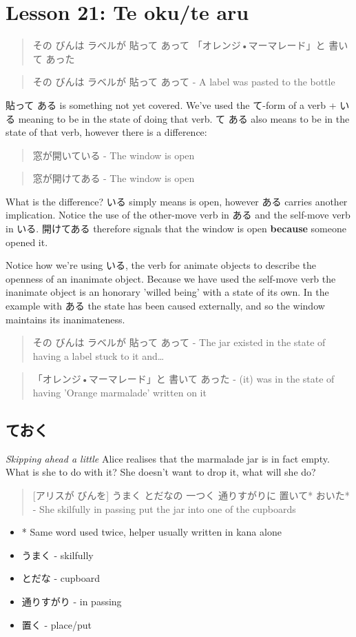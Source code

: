 \documentclass[11pt]{article}
\begin{document}
\section{Lesson 21: Te oku/te aru}
\label{sec:org81fc179}
\begin{quote}
その びんは ラベルが 貼って あって 「オレンジ•マーマレード」と 書いて あった
\end{quote}
\begin{quote}
その びんは ラベルが 貼って あって - A label was pasted to the bottle
\end{quote}
貼って ある is something not yet covered. We've used the て-form of a verb + いる meaning to be in the state of doing that verb. て ある also means to be in the state of that verb, however there is a difference:
\begin{quote}
窓が開いている - The window is open
\end{quote}
\begin{quote}
窓が開けてある - The window is open
\end{quote}
What is the difference? いる simply means is open, however ある carries another implication. Notice the use of the other-move verb in ある and the self-move verb in いる. 開けてある therefore signals that the window is open \textbf{because} someone opened it.

Notice how we're using いる, the verb for animate objects to describe the openness of an inanimate object. Because we have used the self-move verb the inanimate object is an honorary 'willed being' with a state of its own. In the example with ある the state has been caused externally, and so the window maintains its inanimateness.

\begin{quote}
その びんは ラベルが 貼って あって - The jar existed in the state of having a label stuck to it and\ldots{}
\end{quote}

\begin{quote}
「オレンジ•マーマレード」と 書いて あった - (it) was in the state of having 'Orange marmalade' written on it
\end{quote}

\subsection{ておく}
\label{sec:orgd274d38}
\emph{Skipping ahead a little} Alice realises that the marmalade jar is in fact empty. What is she to do with it? She doesn't want to drop it, what will she do?
\begin{quote}
[アリスが びんを] うまく とだなの 一つく 通りすがりに 置いて* おいた* - She skilfully in passing put the jar into one of the cupboards
\end{quote}
\begin{itemize}
\item * Same word used twice, helper usually written in kana alone
\item うまく - skilfully
\item とだな - cupboard
\item 通りすがり - in passing
\item 置く - place/put
\end{itemize}
\end{document}
